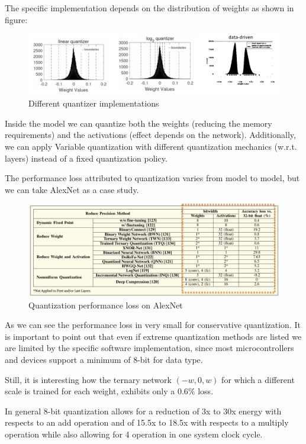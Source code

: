 \documentclass{article}
\begin{document}
        The specific implementation depends on the distribution of weights as shown in figure:
        \begin{figure}[H]
          \includegraphics[scale=0.3]{../Images/WeightDistribution.png}
          \centering
          \caption{Different quantizer implementations}
        \end{figure}

        Inside the model we can quantize both the weights (reducing the memory requirements) and the activations (effect depends on the network). Additionally, we can apply Variable quantization with different quantization mechanics (w.r.t. layers) instead of a fixed quantization policy.

        The performance loss attributed to quantization varies from model to model, but we can take AlexNet as a case study.
        \begin{figure}[H]
          \includegraphics[scale=0.3]{../Images/QuantizationPerformance.png}
          \centering
          \caption{Quantization performance loss on AlexNet}
        \end{figure}

        As we can see the performance loss in very small for conservative quantization. It is important to point out that even if extreme quantization methods are listed we are limited by the specific software implementation, since most microcontrollers and devices support a minimum of 8-bit for data type.

        Still, it is interesting how the ternary network $(-w, 0, w)$ for which a different scale is trained for each weight, exhibits only a $0.6\%$ loss.

        In general 8-bit quantization allows for a reduction of 3x to 30x energy with respects to an add operation and of 15.5x to 18.5x with respects to a multiply operation while also allowing for 4 operation in one system clock cycle. 
\end{document}
